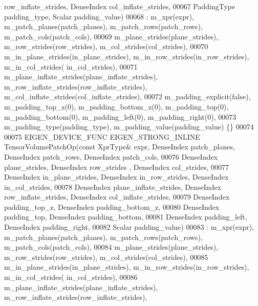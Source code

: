 \begin{DoxyCode}
      row\_inflate\_strides, DenseIndex col\_inflate\_strides,
00067                                                             PaddingType padding\_type, Scalar padding\_value)
00068       : m\_xpr(expr), m\_patch\_planes(patch\_planes), m\_patch\_rows(patch\_rows), m\_patch\_cols(patch\_cols),
00069         m\_plane\_strides(plane\_strides), m\_row\_strides(row\_strides), m\_col\_strides(col\_strides),
00070         m\_in\_plane\_strides(in\_plane\_strides), m\_in\_row\_strides(in\_row\_strides), m\_in\_col\_strides(
      in\_col\_strides),
00071         m\_plane\_inflate\_strides(plane\_inflate\_strides), m\_row\_inflate\_strides(row\_inflate\_strides), 
      m\_col\_inflate\_strides(col\_inflate\_strides),
00072         m\_padding\_explicit(false), m\_padding\_top\_z(0), m\_padding\_bottom\_z(0), m\_padding\_top(0), 
      m\_padding\_bottom(0), m\_padding\_left(0), m\_padding\_right(0),
00073         m\_padding\_type(padding\_type), m\_padding\_value(padding\_value) \{\}
00074 
00075   EIGEN\_DEVICE\_FUNC EIGEN\_STRONG\_INLINE TensorVolumePatchOp(\textcolor{keyword}{const} XprType& expr, DenseIndex patch\_planes, 
      DenseIndex patch\_rows, DenseIndex patch\_cols,
00076                                                            DenseIndex plane\_strides, DenseIndex row\_strides
      , DenseIndex col\_strides,
00077                                                            DenseIndex in\_plane\_strides, DenseIndex 
      in\_row\_strides, DenseIndex in\_col\_strides,
00078                                                            DenseIndex plane\_inflate\_strides, DenseIndex 
      row\_inflate\_strides, DenseIndex col\_inflate\_strides,
00079                                                            DenseIndex padding\_top\_z, DenseIndex 
      padding\_bottom\_z,
00080                                                            DenseIndex padding\_top, DenseIndex 
      padding\_bottom,
00081                                                            DenseIndex padding\_left, DenseIndex 
      padding\_right,
00082                                                            Scalar padding\_value)
00083       : m\_xpr(expr), m\_patch\_planes(patch\_planes), m\_patch\_rows(patch\_rows), m\_patch\_cols(patch\_cols),
00084         m\_plane\_strides(plane\_strides), m\_row\_strides(row\_strides), m\_col\_strides(col\_strides),
00085         m\_in\_plane\_strides(in\_plane\_strides), m\_in\_row\_strides(in\_row\_strides), m\_in\_col\_strides(
      in\_col\_strides),
00086         m\_plane\_inflate\_strides(plane\_inflate\_strides), m\_row\_inflate\_strides(row\_inflate\_strides), 

\end{DoxyCode}
